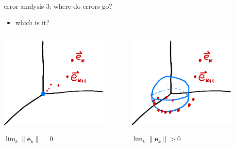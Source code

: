 \documentclass[usepdftitle=false,usenames,dvipsnames]{beamer}
\newcommand{\be}{\mathbf{e}}
\begin{document}
\begin{frame}{error analysis 3: where do errors go?}

\begin{itemize}
\item which is it?
\end{itemize}

\vspace{10mm}
\begin{columns}
\begin{column}{0.5\textwidth}
\centering
\includegraphics[width=0.85\textwidth]{figs/zero-limit.png}

\vspace{-3mm}
$\lim_k \|\be_k\| = 0$
\end{column}
\begin{column}{0.5\textwidth}
\centering
\includegraphics[width=0.85\textwidth]{figs/ball-limit.png}

\vspace{-3mm}
$\lim_k \|\be_k\| > 0$
\end{column}
\end{columns}
\end{frame}
\end{document}
